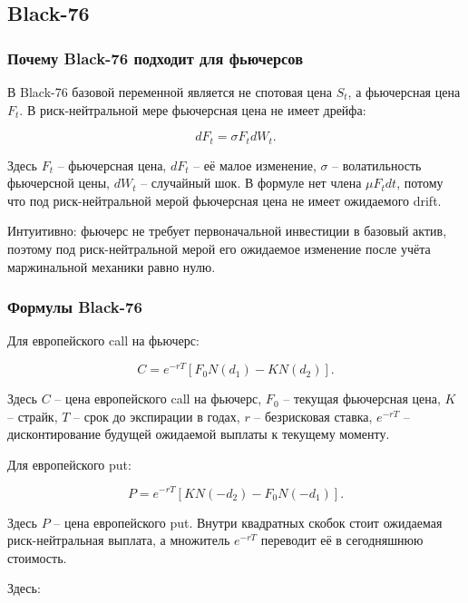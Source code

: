 \documentclass[11pt,a4paper]{article}
\begin{document}
\subsection{Black-76}

\subsubsection{Почему Black-76 подходит для фьючерсов}

В Black-76 базовой переменной является не спотовая цена $S_t$, а фьючерсная цена $F_t$. В риск-нейтральной мере фьючерсная цена не имеет дрейфа:

\begin{equation}
dF_t = \sigma F_t dW_t.
\end{equation}

Здесь $F_t$ -- фьючерсная цена, $dF_t$ -- её малое изменение, $\sigma$ -- волатильность фьючерсной цены, $dW_t$ -- случайный шок. В формуле нет члена $\mu F_tdt$, потому что под риск-нейтральной мерой фьючерсная цена не имеет ожидаемого drift.

Интуитивно: фьючерс не требует первоначальной инвестиции в базовый актив, поэтому под риск-нейтральной мерой его ожидаемое изменение после учёта маржинальной механики равно нулю.

\subsubsection{Формулы Black-76}

Для европейского call на фьючерс:

\begin{equation}
C =
e^{-rT}
\left[
F_0N(d_1)-KN(d_2)
\right].
\end{equation}

Здесь $C$ -- цена европейского call на фьючерс, $F_0$ -- текущая фьючерсная цена, $K$ -- страйк, $T$ -- срок до экспирации в годах, $r$ -- безрисковая ставка, $e^{-rT}$ -- дисконтирование будущей ожидаемой выплаты к текущему моменту.

Для европейского put:

\begin{equation}
P =
e^{-rT}
\left[
KN(-d_2)-F_0N(-d_1)
\right].
\end{equation}

Здесь $P$ -- цена европейского put. Внутри квадратных скобок стоит ожидаемая риск-нейтральная выплата, а множитель $e^{-rT}$ переводит её в сегодняшнюю стоимость.

Здесь:
\end{document}
